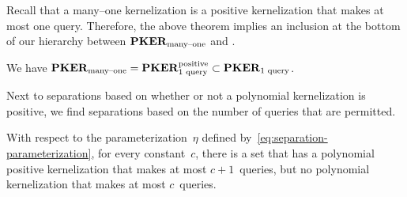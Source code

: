 Recall that a many--one kernelization is a positive kernelization that makes at most one query.
Therefore, the above theorem implies an inclusion at the bottom of our hierarchy between $\textnormal{\textbf{PKER}}_\textnormal{many--one}$ and .
\begin{corollary}
  We have $\textnormal{\textbf{PKER}}_\textnormal{many--one} = \textnormal{\textbf{PKER}}^\textnormal{positive}_\textnormal{$1$ query} \subset \textnormal{\textbf{PKER}}_\textnormal{$1$ query}$.
\end{corollary}

Next to separations based on whether or not a polynomial kernelization is positive, we find separations based on the number of queries that are permitted.
\begin{theorem}
\label{thm:hc}%
  With respect to the parameterization~$\eta$ defined by~\eqref{eq:separation-parameterization}, for every constant~$c$, there is a set that has a polynomial positive kernelization that makes at most $c + 1$~queries, but no polynomial kernelization that makes at most $c$~queries.
\end{theorem}
